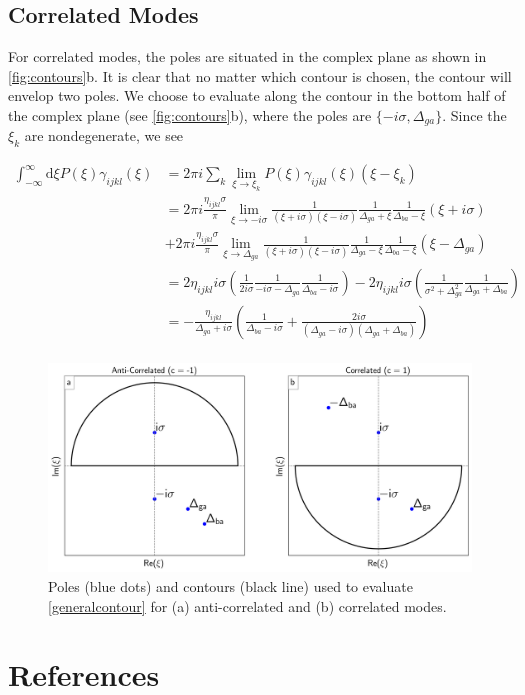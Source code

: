 \documentclass[aip, jcp, reprint, onecolumn, nofootinbib]{revtex4-2}
\begin{document}
\subsection{Correlated Modes}
For correlated modes, the poles are situated in the complex plane as shown in \autoref{fig:contours}b.
It is clear that no matter which contour is chosen, the contour will envelop two poles.
We choose to evaluate along the contour in the bottom half of the complex plane (see \autoref{fig:contours}b), where the poles are $\{-i\sigma, \Delta_{ga}\}$.
Since the $\xi_k$ are nondegenerate, we see
\begin{widetext}
	\begin{equation}
		\begin{split}
			\int_{-\infty}^\infty \mathrm{d}\xi P(\xi) \gamma_{ijkl}(\xi) &= 2\pi i \sum_k \lim_{\xi \rightarrow \xi_k} P(\xi) \gamma_{ijkl}(\xi) (\xi - \xi_k)\\
			&= 2\pi i \frac{\eta_{ijkl} \sigma}{\pi}  \lim_{\xi \rightarrow -i\sigma} \frac{1}{(\xi + i\sigma)(\xi - i\sigma)} \frac{1}{\Delta_{ga} + \xi} \frac{1}{\Delta_{ba} - \xi} \left(\xi + i \sigma\right) \\ 
			&+ 2\pi i \frac{\eta_{ijkl} \sigma}{\pi} \lim_{\xi \rightarrow \Delta_{ga}} \frac{1}{(\xi + i\sigma)(\xi - i\sigma)} \frac{1}{\Delta_{ga} - \xi} \frac{1}{\Delta_{ba} - \xi} \left(\xi - \Delta_{ga}\right)\\
			&= 2 \eta_{ijkl} i \sigma \left(\frac{1}{2 i \sigma} \frac{1}{-i \sigma - \Delta_{ga}} \frac{1}{\Delta_{ba} - i\sigma} \right) - 2\eta_{ijkl} i \sigma \left(\frac{1}{\sigma^2 + \Delta_{ga} ^2} \frac{1}{\Delta_{ga} + \Delta_{ba}} \right)\\
			&= -\frac{\eta_{ijkl}}{\Delta_{ga} + i \sigma} \left(\frac{1}{\Delta_{ba} - i \sigma} + \frac{2i\sigma}{(\Delta_{ga} - i \sigma)(\Delta_{ga} + \Delta_{ba})}\right)\\
		\end{split}
	\end{equation}
\end{widetext}


\begin{figure}[!htbp]
	\centering
	\includegraphics[width=6.675in]{figures/corr_contour.png}
	\caption{Poles (blue dots) and contours (black line) used to evaluate \autoref{generalcontour} for (a) anti-correlated and (b) correlated modes.} 
	\label{fig:contours}
\end{figure}


\section{References}

\end{document}
